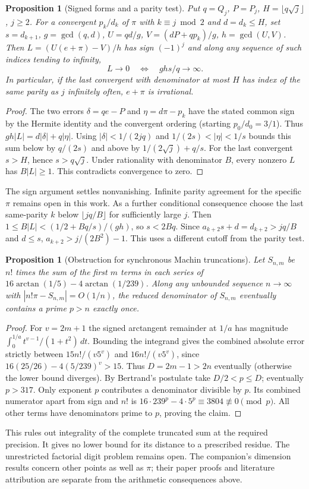 \documentclass[11pt]{amsart}
\newtheorem{proposition}[theorem]{Proposition}
\theoremstyle{definition}
\theoremstyle{remark}
\numberwithin{equation}{section}
\begin{document}
\begin{proposition}[Signed forms and a parity test]\label{prop:signed-round}
Put $q=Q_j$, $P=P_j$, $H=\lfloor q\sqrt j\rfloor$, $j\ge2$.
For a convergent $p_k/d_k$ of $\pi$ with $k\equiv j\bmod 2$ and
$d=d_k\le H$, set $s=d_{k+1}$, $g=\gcd(q,d)$,
$U=qd/g$, $V=(dP+qp_k)/g$, $h=\gcd(U,V)$.
Then $L=(U(e+\pi)-V)/h$ has sign $(-1)^j$ and along any sequence
of such indices tending to infinity,
\[
 L\to0\quad\Longleftrightarrow\quad ghs/q\to\infty .
\]
In particular, if the last convergent with denominator at most $H$
has index of the same parity as $j$ infinitely often, $e+\pi$ is irrational.
\end{proposition}
\begin{proof}
The two errors $\delta=qe-P$ and $\eta=d\pi-p_k$ have the stated
common sign by the Hermite identity and the convergent ordering
(starting $p_0/d_0=3/1$). Thus $gh|L|=d|\delta|+q|\eta|$.
Using $|\delta|<1/(2jq)$ and $1/(2s)<|\eta|<1/s$ bounds this sum
below by $q/(2s)$ and above by $1/(2\sqrt j)+q/s$.
For the last convergent $s>H$, hence $s>q\sqrt j$.
Under rationality with denominator $B$, every nonzero $L$ has
$B|L|\ge1$. This contradicts convergence to zero.
\end{proof}
The sign argument settles nonvanishing. Infinite parity agreement for
the specific $\pi$ remains open in this work. As a further conditional
consequence choose the last same-parity $k$ below
$\lfloor jq/B\rfloor$ for sufficiently large $j$. Then
$1\le B|L|<(1/2+Bq/s)/(gh)$, so $s<2Bq$.
Since $a_{k+2}s+d=d_{k+2}>jq/B$ and $d\le s$,
$a_{k+2}>j/(2B^2)-1$. This uses a different cutoff from the parity test.

\begin{proposition}[Obstruction for synchronous Machin truncations]
Let $S_{n,m}$ be $n!$ times the sum of the first $m$ terms in each
series of $16\arctan(1/5)-4\arctan(1/239)$. Along any unbounded
sequence $n\to\infty$ with $|n!\pi-S_{n,m}|=O(1/n)$, the reduced
denominator of $S_{n,m}$ eventually contains a prime $p>n$ exactly once.
\end{proposition}
\begin{proof}
For $v=2m+1$ the signed arctangent remainder at $1/a$ has magnitude
$\int_0^{1/a}t^{v-1}/(1+t^2)\,dt$. Bounding the integrand gives the
combined absolute error strictly between $15n!/(v5^v)$ and
$16n!/(v5^v)$, since $16(25/26)-4(5/239)^v>15$.
Thus $D=2m-1>2n$ eventually (otherwise the lower bound diverges).
By Bertrand's postulate take $D/2<p\le D$; eventually $p>317$.
Only exponent $p$ contributes a denominator divisible by $p$.
Its combined numerator apart from sign and $n!$ is
$16\cdot239^p-4\cdot5^p\equiv3804\not\equiv0\pmod p$.
All other terms have denominators prime to $p$, proving the claim.
\end{proof}
This rules out integrality of the complete truncated sum at the
required precision. It gives no lower bound for its distance to a
prescribed residue. The unrestricted factorial digit problem remains
open. The companion's dimension results concern other points as well
as $\pi$; their paper proofs and literature attribution are separate
from the arithmetic consequences above.
\end{document}
